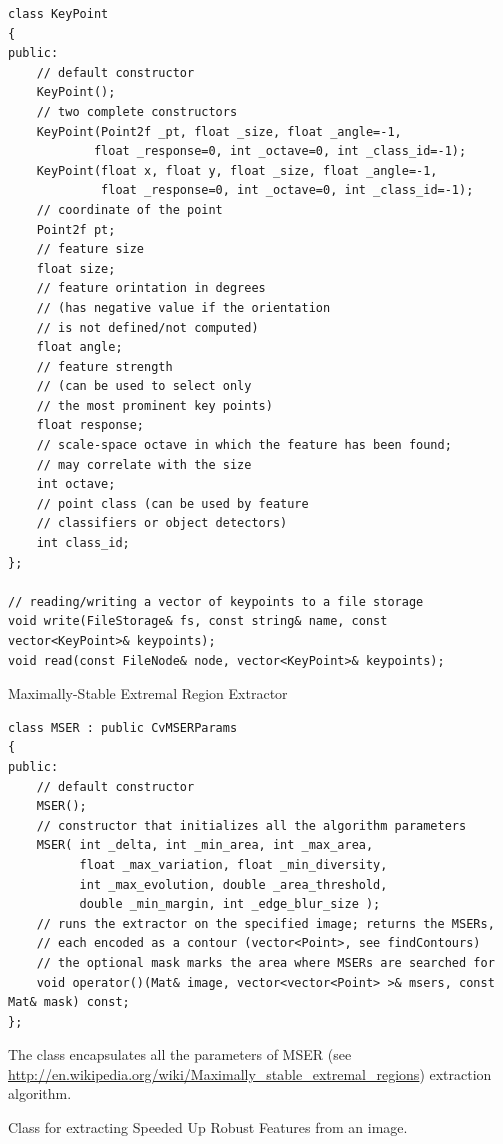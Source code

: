 \begin{lstlisting}
class KeyPoint
{
public:
    // default constructor
    KeyPoint();
    // two complete constructors
    KeyPoint(Point2f _pt, float _size, float _angle=-1,
            float _response=0, int _octave=0, int _class_id=-1);
    KeyPoint(float x, float y, float _size, float _angle=-1,
             float _response=0, int _octave=0, int _class_id=-1);
    // coordinate of the point
    Point2f pt;
    // feature size
    float size;
    // feature orintation in degrees
    // (has negative value if the orientation
    // is not defined/not computed)
    float angle;
    // feature strength
    // (can be used to select only
    // the most prominent key points)
    float response;
    // scale-space octave in which the feature has been found;
    // may correlate with the size
    int octave;
    // point class (can be used by feature
    // classifiers or object detectors)
    int class_id;
};

// reading/writing a vector of keypoints to a file storage
void write(FileStorage& fs, const string& name, const vector<KeyPoint>& keypoints);
void read(const FileNode& node, vector<KeyPoint>& keypoints);    
\end{lstlisting}


\label{MSER}
Maximally-Stable Extremal Region Extractor

\begin{lstlisting}
class MSER : public CvMSERParams
{
public:
    // default constructor
    MSER();
    // constructor that initializes all the algorithm parameters
    MSER( int _delta, int _min_area, int _max_area,
          float _max_variation, float _min_diversity,
          int _max_evolution, double _area_threshold,
          double _min_margin, int _edge_blur_size );
    // runs the extractor on the specified image; returns the MSERs,
    // each encoded as a contour (vector<Point>, see findContours)
    // the optional mask marks the area where MSERs are searched for
    void operator()(Mat& image, vector<vector<Point> >& msers, const Mat& mask) const;
};
\end{lstlisting}

The class encapsulates all the parameters of MSER (see \url{http://en.wikipedia.org/wiki/Maximally_stable_extremal_regions}) extraction algorithm. 

\label{SURF}
Class for extracting Speeded Up Robust Features from an image.

